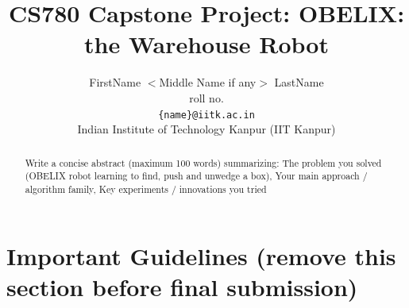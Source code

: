 \documentclass[11pt, oneside]{article}   	%
\title{CS780 Capstone Project: 
OBELIX: the Warehouse Robot
}
\author{
    FirstName $<$Middle Name if any$>$ LastName  \\ 
    roll no.\\
   {\tt \{name\}@iitk.ac.in}\\
{Indian Institute of Technology Kanpur (IIT Kanpur)}
}
\date{}							%
\begin{document}
\maketitle

\begin{abstract}

Write a concise abstract (maximum 100 words) summarizing: The problem you solved (OBELIX robot learning to find, push and unwedge a box), Your main approach / algorithm family, Key experiments / innovations you tried

\end{abstract}

\section*{Important Guidelines (remove this section before final submission)}
\end{document}
